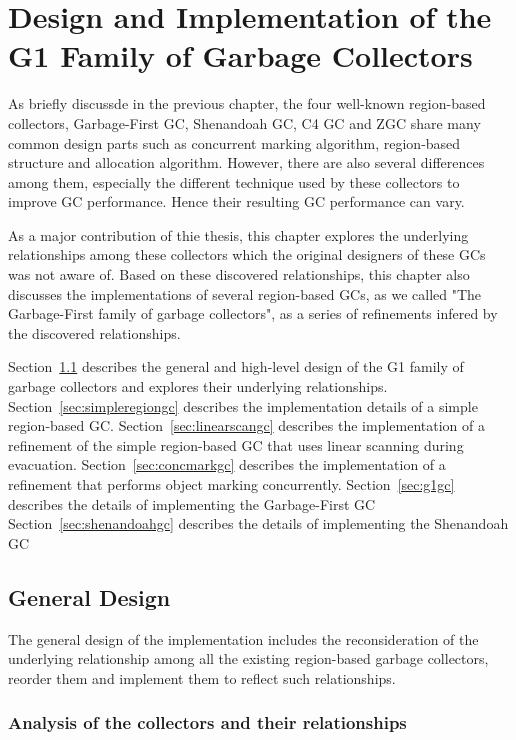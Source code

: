 \chapter{Design and Implementation of the G1 Family of Garbage Collectors}
\label{cha:implementation}

As briefly discussde in the previous chapter, the four well-known region-based collectors, Garbage-First GC, Shenandoah GC, C4 GC and
ZGC share many common design parts such as concurrent marking algorithm, region-based
structure and allocation algorithm. However, there are also several differences
among them, especially the different technique used by these collectors to improve GC performance.
Hence their resulting GC performance can vary.

As a major contribution of thie thesis, this chapter explores the underlying relationships
among these collectors which the original designers of these GCs was not aware of.
Based on these discovered relationships, this chapter also discusses the implementations
of several region-based GCs, as we called "The Garbage-First family of garbage collectors",
as a series of refinements infered by the discovered relationships.

Section~\ref{sec:generaldesign} describes the general and high-level design of the
G1 family of garbage collectors and explores their underlying relationships.
Section~\ref{sec:simpleregiongc} describes the implementation details of a simple region-based GC.
Section~\ref{sec:linearscangc} describes the implementation of a refinement of the simple region-based GC that uses linear scanning during evacuation.
Section~\ref{sec:concmarkgc} describes the implementation of a refinement that performs object marking concurrently.
Section~\ref{sec:g1gc} describes the details of implementing the Garbage-First GC
Section~\ref{sec:shenandoahgc} describes the details of implementing the Shenandoah GC



\section{General Design}
\label{sec:generaldesign}

The general design of the implementation includes the reconsideration of the underlying
relationship among all the existing region-based garbage collectors, reorder them
and implement them to reflect such relationships.

\subsection{Analysis of the collectors and their relationships}

